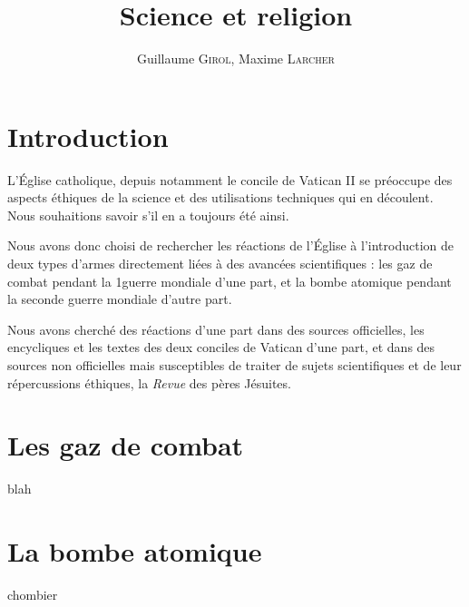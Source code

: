 \documentclass[a4paper, 12pt]{article}
\title{Science et religion}
\author{Guillaume \textsc{Girol}, Maxime \textsc{Larcher}}
\begin{document}
\maketitle

\section*{Introduction}
L'Église catholique, depuis notamment le concile de Vatican II \cite{Vatican2} se préoccupe des aspects éthiques de la science et des utilisations techniques qui en découlent. Nous souhaitions savoir s'il en a toujours été ainsi.

Nous avons donc choisi de rechercher les réactions de l'Église à l'introduction de deux types d'armes directement liées à des avancées scientifiques : les gaz de combat pendant la 1\iere guerre mondiale d'une part, et la bombe atomique pendant la seconde guerre mondiale d'autre part.

Nous avons cherché des réactions d'une part dans des sources officielles, les encycliques et les textes des deux conciles de Vatican d'une part, et dans des sources non officielles mais susceptibles de traiter de sujets scientifiques et de leur répercussions éthiques, la \emph{Revue}\cite{Revue} des pères Jésuites.
\tableofcontents

\section{Les gaz de combat}
blah
\section{La bombe atomique}
chombier





\end{document}
